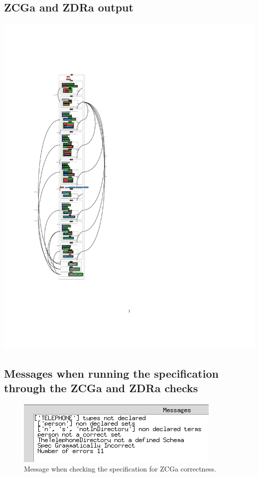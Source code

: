 \subsection{ZCGa and ZDRa output}
\noindent \includegraphics[clip, trim=0cm 4cm 6cm 4.2cm]{examples/nonworkzcga/1n2.pdf}

\subsection{Messages when running the specification through the ZCGa and ZDRa checks}

\begin{figure}[H]
\includegraphics[scale=0.7]{examples/nonworkzcga/incorrect.png}
\caption{Message when checking the specification for ZCGa correctness.}
\end{figure}

